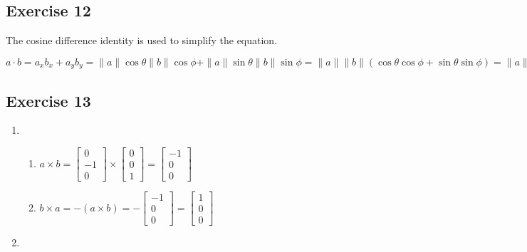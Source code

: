 \documentclass[11pt]{article}
\begin{document}
\subsection{Exercise 12}

The cosine difference identity is used to simplify the equation.

$a\cdot{}b=a_xb_x+a_yb_y=\|a\|\cos\theta\|b\|\cos\phi+\|a\|\sin\theta\|b\|\sin\phi=\|a\|\|b\|(\cos\theta\cos\phi+\sin\theta\sin\phi)=\|a\|\|b\|\cos(\theta-\phi)$

\subsection{Exercise 13}

\begin{enumerate}[a]
	\item %
	\begin{enumerate}
		\item %
$a \times b=
\begin{bmatrix}
0 \\
-1 \\
0
\end{bmatrix}\times
\begin{bmatrix}
0 \\
0 \\
1
\end{bmatrix}=
\begin{bmatrix}
-1 \\
0 \\
0
\end{bmatrix}$
		\item %
$b \times a=-(a \times b)=
-\begin{bmatrix}
-1 \\
0 \\
0
\end{bmatrix}=
\begin{bmatrix}
1 \\
0 \\
0
\end{bmatrix}$
	\end{enumerate}
	\item %
\end{enumerate}
\end{document}
